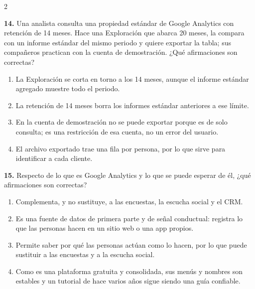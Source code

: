 \documentclass[10pt,letterpaper]{article}
\newcommand{\cas}{\framebox[1.0em]{\rule{0pt}{1.05ex}}}
\begin{document}
\begin{multicols}{2}
\begin{minipage}[t]{\columnwidth}\noindent\textbf{14.} Una analista consulta una propiedad estándar de Google Analytics con retención de 14 meses. Hace una Exploración que abarca 20 meses, la compara con un informe estándar del mismo periodo y quiere exportar la tabla; sus compañeros practican con la cuenta de demostración. ¿Qué afirmaciones son correctas?
\vspace{1pt}\begin{enumerate}[label=\cas\ \alph*),leftmargin=2.3em,itemsep=1.2pt,topsep=1pt,parsep=0pt,partopsep=0pt]
\item La Exploración se corta en torno a los 14 meses, aunque el informe estándar agregado muestre todo el periodo.
\item La retención de 14 meses borra los informes estándar anteriores a ese límite.
\item En la cuenta de demostración no se puede exportar porque es de solo consulta; es una restricción de esa cuenta, no un error del usuario.
\item El archivo exportado trae una fila por persona, por lo que sirve para identificar a cada cliente.
\end{enumerate}\end{minipage}\par\vspace{3pt}
\begin{minipage}[t]{\columnwidth}\noindent\textbf{15.} Respecto de lo que es Google Analytics y lo que se puede esperar de él, ¿qué afirmaciones son correctas?
\vspace{1pt}\begin{enumerate}[label=\cas\ \alph*),leftmargin=2.3em,itemsep=1.2pt,topsep=1pt,parsep=0pt,partopsep=0pt]
\item Complementa, y no sustituye, a las encuestas, la escucha social y el CRM.
\item Es una fuente de datos de primera parte y de señal conductual: registra lo que las personas hacen en un sitio web o una app propios.
\item Permite saber por qué las personas actúan como lo hacen, por lo que puede sustituir a las encuestas y a la escucha social.
\item Como es una plataforma gratuita y consolidada, sus menús y nombres son estables y un tutorial de hace varios años sigue siendo una guía confiable.
\end{enumerate}\end{minipage}\par\vspace{3pt}

\end{multicols}
\end{document}
